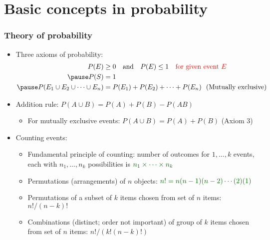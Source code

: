 \documentclass[usenames,dvipsnames,smaller]{beamer}
\newcommand{\?}{\stackrel{?}{=}}
\newcommand{\rd}{\color{red}}
\newcommand{\gr}{\color{green!40!black}}
\begin{document}
\section{Basic concepts in probability}

\begin{frame}
  \frametitle{Theory of probability}
  \begin{itemize}[<+->]
  \item Three axioms of probability: 
    \begin{align*}
      P(E) &\ge 0 \quad \text{and} \quad P(E) \le 1 \quad \text{\rd for given event $E$}\\\pause
      P(S) &= 1 \\\pause
      P(E_{1}\cup E_{2}\cup \cdots\cup E_{n}) &= P(E_{1}) + P(E_{2}) + \cdots + P(E_{n})~~ \text{(Mutually exclusive)}
    \end{align*}
  \item Addition rule: $P(A\cup B) = P(A) + P(B) - P(AB)$
    \begin{itemize}[<+->]
    \item For mutually exclusive events: $P(A\cup B) = P(A) + P(B)$ (Axiom 3)
\end{itemize}

  \item Counting events:
    \begin{itemize}[<+->]
    \item Fundamental principle of counting: number of outcomes for $1, \ldots, k$ events, each with $n_{1},\ldots, n_{k}$ possibilities is $\gr n_{1}\times\cdots \times n_{k}$
    \item Permutations (arrangements) of $n$ objects: $\gr n! = n(n-1)(n-2)\cdots(2)(1)$
    \item Permutations of a subset of $k$ items chosen from set of $n$ items: $n!/(n-k)!$
    \item Combinations (distinct; order not important) of group of $k$ items chosen from set of $n$ items: $n!/(k!(n-k)!)$
    \end{itemize}
  \end{itemize}
\end{frame}
\end{document}
